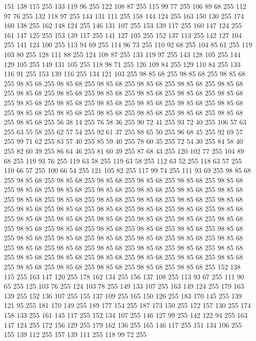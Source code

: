 151 138 115 255 133 119 96 255 122 108 87 255 115 99 77 255 106 89 68 255 112 97 76 255 132 118 97 255 144 131 111 255 158 144 124 255 163 150 130 255 174 160 138 255 162 148 124 255 146 131 107 255 153 139 117 255 160 147 124 255 161 147 125 255 153 139 117 255 141 127 105 255 152 137 113 255 142 127 104 255 141 124 100 255 113 94 69 255 114 96 73 255 110 92 68 255 104 85 61 255 119 103 80 255 128 111 88 255 124 108 87 255 133 119 97 255 143 128 105 255 144 129 105 255 149 131 105 255 118 98 71 255 126 109 84 255 129 110 84 255 133 116 91 255 153 139 116 255 134 121 103 255 98 85 68 255 98 85 68 255 98 85 68 255 98 85 68 255 98 85 68 255 98 85 68 255 98 85 68 255 98 85 68 255 98 85 68 255 98 85 68 255 98 85 68 255 98 85 68 255 98 85 68 255 98 85 68 255 98 85 68 255 98 85 68 255 98 85 68 255 98 85 68 255 98 85 68 255 98 85 68 255 98 85 68 255 98 85 68 255 98 85 68 255 98 85 68 255 98 85 68 255 98 85 68 255
98 85 68 255 98 85 68 255 56 38 14 255 76 58 36 255 90 72 41 255 93 72 40 255 106 57 63 255 63 55 58 255 62 57 54 255 92 61 37 255 88 65 50 255 96 68 45 255 92 69 57 255 99 71 62 255 83 57 40 255 85 59 40 255 78 60 35 255 72 54 30 255 84 58 40 255 82 60 39 255 86 64 46 255 81 60 39 255 87 68 43 255 120 102 77 255 104 89 68 255 119 93 76 255 119 63 58 255 119 63 58 255 112 63 52 255 118 63 57 255 110 66 57 255 100 66 54 255 121 105 82 255 117 99 74 255 111 93 69 255 98 85 68 255 98 85 68 255 98 85 68 255 98 85 68 255 98 85 68 255 98 85 68 255 98 85 68 255 98 85 68 255 98 85 68 255 98 85 68 255 98 85 68 255 98 85 68 255 98 85 68 255 98 85 68 255 98 85 68 255 98 85 68 255 98 85 68 255 98 85 68 255 98 85 68 255 98 85 68 255 98 85 68 255 98 85 68 255 98 85 68 255 98 85 68 255 98 85 68 255 98 85 68 255 98 85 68 255 98 85 68 255 98 85 68 255
98 85 68 255 98 85 68 255 98 85 68 255 98 85 68 255 98 85 68 255 98 85 68 255 98 85 68 255 98 85 68 255 98 85 68 255 98 85 68 255 98 85 68 255 98 85 68 255 98 85 68 255 98 85 68 255 98 85 68 255 98 85 68 255 98 85 68 255 98 85 68 255 98 85 68 255 98 85 68 255 98 85 68 255 98 85 68 255 98 85 68 255 98 85 68 255 98 85 68 255 98 85 68 255 98 85 68 255 98 85 68 255 98 85 68 255 98 85 68 255 98 85 68 255 152 138 115 255 163 147 120 255 178 162 134 255 156 137 108 255 113 93 67 255 111 90 65 255 125 103 76 255 124 103 78 255 149 133 107 255 163 149 124 255 179 163 139 255 152 136 107 255 155 137 109 255 165 150 126 255 183 170 145 255 139 121 95 255 181 170 149 255 189 177 154 255 187 173 150 255 172 157 130 255 174 158 133 255 161 145 117 255 152 134 107 255 146 127 99 255 142 122 94 255 163 147 124 255 172 156 129 255 179 162 136 255 165 146 117 255 151 134 106 255 155 139 112 255 157 139 111 255 118 99 72 255
